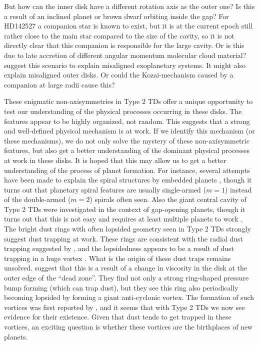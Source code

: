 \documentclass[10pt,fleqn,twoside,a4paper]{article}
\begin{document}
But how can the inner disk have a different rotation axis as the outer one?
Is this a result of an inclined planet or brown dwarf orbiting inside the
gap? For HD142527 a companion star is known to exist, but it is at the
current epoch still rather close to the main star compared to the size of
the cavity, so it is not directly clear that this companion is responsible
for the large cavity. Or is this due to late accretion of different angular
momentum molecular cloud material? \citet{2011MNRAS.417.1817T} suggest this
scenario to explain misaligned exoplanetary systems. It might also explain
misaligned outer disks. Or could the Kozai-mechanism caused by a companion
at large radii cause this?

These enigmatic non-axisymmetries in Type 2 TDs offer a unique opportunity
to test our understanding of the physical processes occurring in these
disks. The features appear to be highly organized, not random. This suggests
that a strong and well-defined physical mechanism is at work. If we identify
this mechanism (or these mechanisms), we do not only solve the mystery of
these non-axisymmetric features, but also get a better understanding of the
dominant physical processes at work in these disks. It is hoped that this
may allow us to get a better understanding of the process of planet
formation.  For instance, several attempts have been made to explain the
spiral structures by embedded planets \citep{2012ApJ...748L..22M,
  2015A&A...578L...6B, 2015MNRAS.453.1768P}, though it turns out that
planetary spiral features are usually single-armed ($m=1$) instead of the
double-armed ($m=2$) spirals often seen. Also the giant central cavity of
Type 2 TDs were investigated in the context of gap-opening planets, though
it turns out that this is not easy and requires at least multiple planets to
work \citep{2011ApJ...729...47Z}. The bright dust rings with often lopsided
geometry seen in Type 2 TDs strongly suggest dust trapping at work. These
rings are consistent with the radial dust trapping suggested by
\citet{1972fpp..conf..211W}, and the lopsidedness appears to be a result of
dust trapping in a huge vortex \citep{1995A&A...295L...1B,
  1997Icar..128..213K, 2013A&A...550L...8B, 2013A&A...553L...3A,
  2014ApJ...795...53Z, 2016MNRAS.458.3927B}. What is the origin of these
dust traps remains unsolved. \citet{2012MNRAS.419.1701R} suggest that this
is a result of a change in viscosity in the disk at the outer edge of the
``dead zone''.  They find not only a strong ring-shaped pressure bump
forming (which can trap dust), but they see this ring also periodically
becoming lopsided by forming a giant anti-cyclonic vortex. The formation of
such vortices was first reported by \citet{1999ApJ...513..805L}, and it
seems that with Type 2 TDs we now see evidence for their existence. Given
that dust tends to get trapped in these vortices, an exciting question is
whether these vortices are the birthplaces of new planets.
\end{document}
